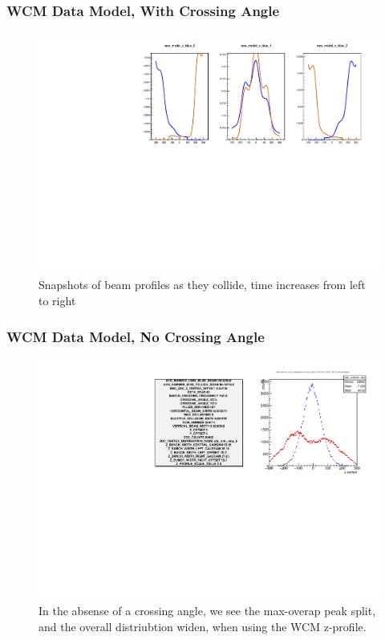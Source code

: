 \begin{frame}
\frametitle{WCM Data Model, With Crossing Angle }
\begin{figure}
\begin{center}
\includegraphics[width=\linewidth]{../OverlapTest/figs/359711_model0_angle_zprofile.pdf}
\end{center}
\caption{Snapshots of beam profiles as they collide, time increases from left to right }
\label{fig:359711_model0_angle_zprofile}
\end{figure}
\end{frame}


\begin{frame}
\frametitle{WCM Data Model, No Crossing Angle}
\begin{figure}
\begin{center}
\includegraphics[width=\linewidth]{../OverlapTest/figs/359711_model0_noangle_vertex.pdf}
\end{center}
\caption{In the absense of a crossing angle, we see the max-overap peak split,
and the overall distriubtion widen, when using the WCM z-profile. }
\label{fig:359711_model0_noangle_vertex}
\end{figure}
\end{frame}


